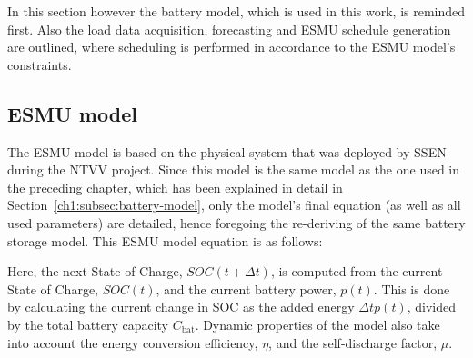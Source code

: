 In this section however the battery model, which is used in this work, is reminded first.
Also the load data acquisition, forecasting and ESMU schedule generation are outlined, where scheduling is performed in accordance to the ESMU model's constraints.

\subsection{ESMU model}
\label{ch2:subsec:esmu-model}

\nomenclature[J]{$\mu$}{Self-discharge losses of battery, where $\mu \in (0, 1]$}
\nomenclature[J]{$\eta$}{Round-trip efficiency of power electronics, where $\eta \in (0, 1]$}

The ESMU model is based on the physical system that was deployed by SSEN during the NTVV project.
Since this model is the same model as the one used in the preceding chapter, which has been explained in detail in Section~\ref{ch1:subsec:battery-model}, only the model's final equation (as well as all used parameters) are detailed, hence foregoing the re-deriving of the same battery storage model.
This ESMU model equation is as follows:



Here, the next State of Charge, $SOC(t+\Delta t)$, is computed from the current State of Charge, $SOC(t)$, and the current battery power, $p(t)$.
This is done by calculating the current change in SOC as the added energy $\Delta t p(t)$, divided by the total battery capacity $C_\text{bat}$.
Dynamic properties of the model also take into account the energy conversion efficiency, $\eta$, and the self-discharge factor, $\mu$.

